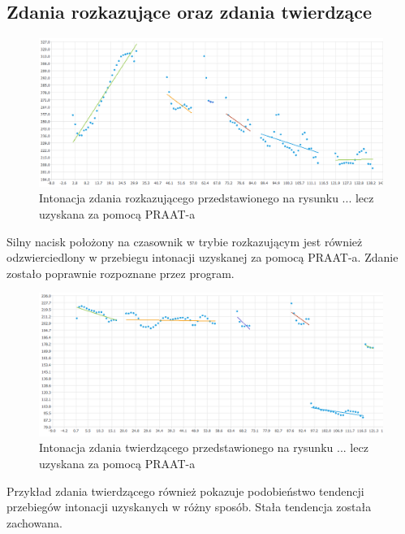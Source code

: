 \documentclass[a4paper,12 pt]{report}
\begin{document}
\subsection{Zdania rozkazujące oraz zdania twierdzące}
\begin{figure}[h]
\centering
\includegraphics[scale=0.7]{rozkaz_1_kob_25.png}
\caption{Intonacja zdania rozkazującego przedstawionego na rysunku ... lecz uzyskana za pomocą PRAAT-a}
\end{figure}
\FloatBarrier

Silny nacisk położony na czasownik w trybie rozkazującym jest również odzwierciedlony w przebiegu intonacji uzyskanej za pomocą PRAAT-a. Zdanie zostało poprawnie rozpoznane przez program.

\begin{figure}[h]
\centering
\includegraphics[scale=0.7]{tw_1_praat.png}
\caption{Intonacja zdania twierdzącego przedstawionego na rysunku ... lecz uzyskana za pomocą PRAAT-a}
\end{figure}
\FloatBarrier
Przykład zdania twierdzącego również pokazuje podobieństwo tendencji przebiegów intonacji uzyskanych w różny sposób. Stała tendencja została zachowana.
\end{document}
